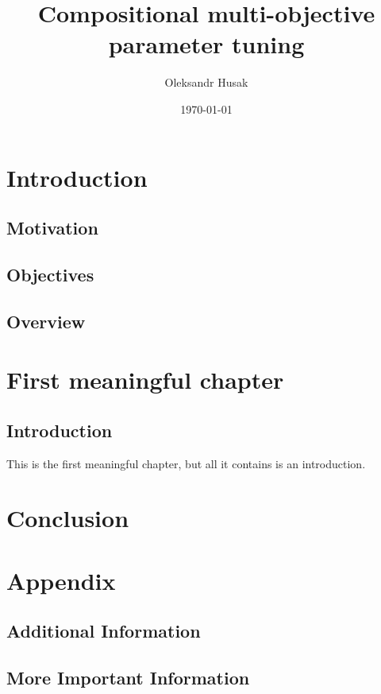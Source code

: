\documentclass[ms,english]{stthesis}
\title{Compositional multi-objective parameter tuning}
\author{Oleksandr Husak}
\date{\today}
\begin{document}
  \maketitle %
  
  \tableofcontents
  
  \chapter{Introduction}
  	\section{Motivation}
  	\lipsum
  	
  	\section{Objectives}
  	\lipsum[1-3]
  	
  	\section{Overview}
	\lipsum[1]
    
  \chapter{First meaningful chapter}
  
     \section{Introduction}
       This is the first meaningful chapter, but all it contains is an introduction.

  \chapter{Conclusion}
  	\lipsum[1]

  \backmatter
  
  \appendix
  \chapter{Appendix}
  \section{Additional Information}
  \lipsum[1]
  
  \section{More Important Information}
  \lipsum[1]
  
\end{document}
